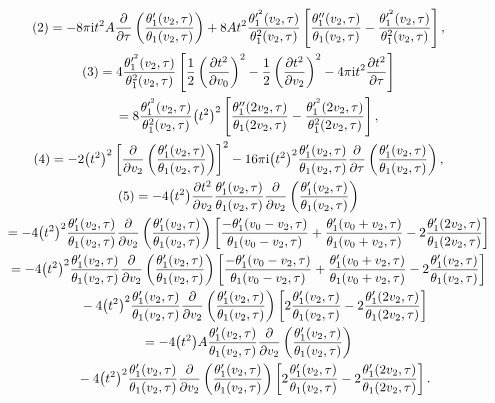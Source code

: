 \documentclass[10pt,a4paper]{amsart}
\numberwithin{equation}{section}
\begin{document}
\begin{gather*}
(2)=-8\pi {\rm i}t^2A\frac{\partial}{\partial \tau}\left(\frac{\theta_1^{\prime}(v_2,\tau)}{\theta_1(v_2,\tau)}\right) +8At^2\frac{\theta_1^{\prime^2}(v_2,\tau)}{\theta_1^2(v_2,\tau)} \left[\frac{\theta_1^{\prime\prime}(v_2,\tau)}{\theta_1(v_2,\tau)} -\frac{\theta_1^{\prime^2}(v_2,\tau)}{\theta_1^2(v_2,\tau)}\right],
\\
(3)=4\frac{\theta_1^{\prime^2}(v_2,\tau)}{\theta_1^2(v_2,\tau)}\left[ \frac{1}{2}\left(\frac{\partial t^2}{\partial v_0}\right)^2- \frac{1}{2}\left(\frac{\partial t^2}{\partial v_2}\right)^2-4\pi {\rm i}t^2\frac{\partial t^2}{\partial \tau}\right]
\\ \hphantom{(3)}
=8\frac{\theta_1^{\prime^2}(v_2,\tau)}{\theta_1^2(v_2,\tau)}\big(t^2\big)^2 \left[\frac{\theta_1^{\prime\prime}(2v_2,\tau)}{\theta_1(2v_2,\tau)} -\frac{\theta_1^{\prime^2}(2v_2,\tau)}{\theta_1^2(2v_2,\tau)}\right],
\\
(4)=-2\big(t^2\big)^2\left[\frac{\partial}{\partial v_2}\left(\frac{\theta_1^{\prime}(v_2,\tau)}{\theta_1(v_2,\tau)}\right)\right]^2-16\pi {\rm i}\big(t^2\big)^2\frac{\theta_1^{\prime}(v_2,\tau)}{\theta_1(v_2,\tau)}\frac{\partial}{\partial \tau}\left(\frac{\theta_1^{\prime}(v_2,\tau)}{\theta_1(v_2,\tau)}\right),
\\
(5)=-4\big(t^2\big)\frac{\partial t^2} {\partial v_2}\frac{\theta_1^{\prime}(v_2,\tau)}{\theta_1(v_2,\tau)}\frac{\partial}{\partial v_2}\left(\frac{\theta_1^{\prime}(v_2,\tau)}{\theta_1(v_2,\tau)}\right)
\\ \hphantom{(5)}
=-4\big(t^2\big)^2\frac{\theta_1^{\prime}(v_2,\tau)}{\theta_1(v_2,\tau)}\frac{\partial}{\partial v_2}\left(\frac{\theta_1^{\prime}(v_2,\tau)}{\theta_1(v_2,\tau)}\right)\left[ \frac{-\theta_1^{\prime}(v_0-v_2,\tau)}{\theta_1(v_0-v_2,\tau)} +\frac{\theta_1^{\prime}(v_0+v_2,\tau)}{\theta_1(v_0+v_2,\tau)} -2\frac{\theta_1^{\prime}(2v_2,\tau)}{\theta_1(2v_2,\tau)}\right]
\\ \hphantom{(5)}
=-4\big(t^2\big)^2\frac{\theta_1^{\prime}(v_2,\tau)}{\theta_1(v_2,\tau)}\frac{\partial}{\partial v_2}\left(\frac{\theta_1^{\prime}(v_2,\tau)}{\theta_1(v_2,\tau)}\right)\left[ \frac{-\theta_1^{\prime}(v_0-v_2,\tau)}{\theta_1(v_0-v_2,\tau)} +\frac{\theta_1^{\prime}(v_0+v_2,\tau)}{\theta_1(v_0+v_2,\tau)} -2\frac{\theta_1^{\prime}(v_2,\tau)}{\theta_1(v_2,\tau)}\right]
\\ \hphantom{(5)=}
-4\big(t^2\big)^2\frac{\theta_1^{\prime}(v_2,\tau)}{\theta_1(v_2,\tau)}\frac{\partial}{\partial v_2}\left(\frac{\theta_1^{\prime}(v_2,\tau)}{\theta_1(v_2,\tau)}\right)\left[ 2\frac{\theta_1^{\prime}(v_2,\tau)}{\theta_1(v_2,\tau)} -2\frac{\theta_1^{\prime}(2v_2,\tau)}{\theta_1(2v_2,\tau)}\right]
\\ \hphantom{(5)}
=-4\big(t^2\big)A\frac{\theta_1^{\prime}(v_2,\tau)}{\theta_1(v_2,\tau)}\frac{\partial}{\partial v_2}\left(\frac{\theta_1^{\prime}(v_2,\tau)}{\theta_1(v_2,\tau)}\right)
\\ \hphantom{(5)=}
-4\big(t^2\big)^2\frac{\theta_1^{\prime}(v_2,\tau)}{\theta_1(v_2,\tau)}\frac{\partial}{\partial v_2}\left(\frac{\theta_1^{\prime}(v_2,\tau)}{\theta_1(v_2,\tau)}\right)\left[ 2\frac{\theta_1^{\prime}(v_2,\tau)}{\theta_1(v_2,\tau)} -2\frac{\theta_1^{\prime}(2v_2,\tau)}{\theta_1(2v_2,\tau)}\right].
\end{gather*}
\end{document}
